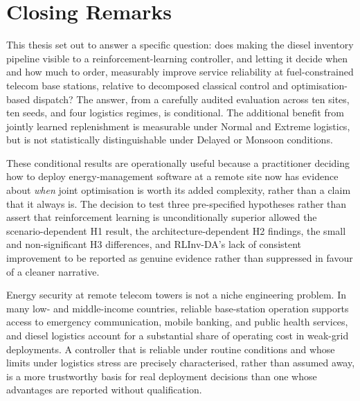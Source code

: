 \section{Closing Remarks}
\label{sec:conclusion_closing}

This thesis set out to answer a specific question: does making the
diesel inventory pipeline visible to a reinforcement-learning
controller, and letting it decide when and how much to order,
measurably improve service reliability at fuel-constrained telecom
base stations, relative to decomposed classical control and
optimisation-based dispatch? The answer, from a carefully audited
evaluation across ten sites, ten seeds, and
four logistics regimes, is conditional. The additional
benefit from jointly learned replenishment is measurable under Normal
and Extreme logistics, but is not statistically distinguishable under
Delayed or Monsoon conditions.

These conditional results are operationally useful because a
practitioner deciding how to deploy energy-management software at a
remote site now has evidence about \emph{when} joint optimisation is
worth its added complexity, rather than a claim that it always is. The
decision to test three pre-specified hypotheses rather than assert
that reinforcement learning is unconditionally superior allowed
the scenario-dependent H1 result, the architecture-dependent H2
findings, the small and non-significant H3 differences, and RLInv-DA's
lack of consistent improvement to
be reported as genuine evidence rather than suppressed in favour of a
cleaner narrative.

Energy security at remote telecom towers is not a niche engineering
problem. In many low- and middle-income countries, reliable
base-station operation supports access to emergency communication,
mobile banking, and public health services, and diesel logistics
account for a substantial share of operating cost in weak-grid
deployments. A controller that is
reliable under routine conditions and whose limits under logistics
stress are precisely characterised, rather than assumed away, is a
more trustworthy basis for real deployment decisions than one whose
advantages are reported without qualification.